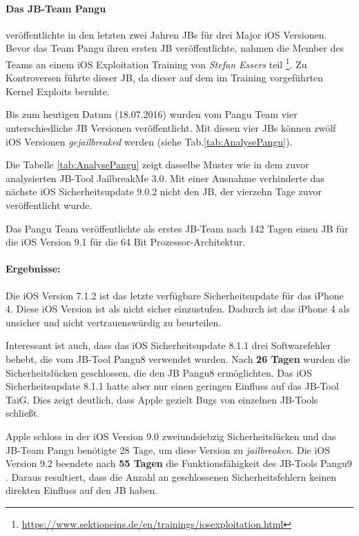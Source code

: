 \paragraph{Das JB-Team Pangu} veröffentlichte in den letzten zwei Jahren JBs für drei Major iOS Versionen. Bevor das Team Pangu ihren ersten JB veröffentlichte, nahmen die Member des Teams an einem iOS Exploitation Training von \textit{\glqq Stefan Essers\grqq{}} teil \footnote{\url{https://www.sektioneins.de/en/trainings/iosexploitation.html}}. Zu Kontroversen führte dieser JB, da dieser auf dem im Training vorgeführten Kernel Exploits beruhte.\par
Bis zum heutigen Datum (18.07.2016) wurden vom Pangu Team vier unterschiedliche JB Versionen veröffentlicht. Mit diesen vier JBs können zwölf iOS Versionen \textit{\glqq gejailbreaked\grqq{}} werden (siehe Tab.\ref{tab:AnalysePangu}).

Die Tabelle \ref{tab:AnalysePangu} zeigt dasselbe Muster wie in dem zuvor analysierten JB-Tool JailbreakMe 3.0. Mit einer Ausnahme verhinderte das nächste iOS Sicherheitsupdate 9.0.2 nicht den JB, der vierzehn Tage zuvor veröffentlicht wurde. \par 
Das Pangu Team veröffentlichte als erstes JB-Team nach 142 Tagen einen JB für die iOS Version 9.1 für die 64 Bit Prozessor-Architektur.

\paragraph{Ergebnisse:}  Die iOS Version 7.1.2 ist das letzte verfügbare Sicherheitsupdate für das iPhone 4. Diese iOS Version ist als nicht sicher einzustufen. Dadurch ist das iPhone 4 als unsicher und nicht vertrauenswürdig zu beurteilen.\par 
Interessant ist auch, dass das iOS Sicherheitsupdate 8.1.1 drei Softwarefehler behebt, die vom JB-Tool Pangu8 verwendet wurden. Nach \textbf{26 Tagen} wurden die Sicherheitslücken geschlossen, die den JB Pangu8 ermöglichten. Das iOS Sicherheitsupdate 8.1.1 hatte aber nur einen geringen Einfluss auf das JB-Tool TaiG. Dies zeigt deutlich, dass Apple gezielt Bugs von einzelnen JB-Tools schließt. 

Apple schloss in der iOS Version 9.0 zweiundsiebzig Sicherheitslücken und das JB-Team Pangu benötigte 28 Tage, um diese Version zu \textit{\glqq jailbreaken\grqq{}}. Die iOS Version 9.2 beendete nach \textbf{55 Tagen} die Funktionsfähigkeit des JB-Tools Pangu9 . Daraus resultiert, dass die Anzahl an geschlossenen Sicherheitsfehlern keinen direkten Einfluss auf den JB haben.

